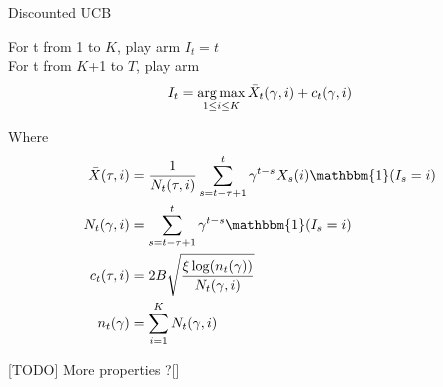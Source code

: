 \begin{algorithm}
    \caption{Discounted UCB}
    \label{alg:d_ucb}
    For t from 1 to $K$, play arm $I_t = t$ \\
    For t from $K$+1 to $T$, play arm 
    $$ I_t = \operatorname*{arg\,max}_{1\leq i \leq K} \bar X_t(\gamma,i) + c_t(\gamma,i)$$
\end{algorithm}

Where
\begin{align}
\bar{X}(\tau, i) &= \frac{1}{N_t(\tau, i)}
\sum_{s=t-\tau+1}^t \gamma^{t-s}X_s(i)\mathbbm{1}(I_s=i)\\
N_t(\gamma, i) &= \sum_{s=t-\tau+1}^t \gamma^{t-s}\mathbbm{1}(I_s=i)\\
c_t(\tau, i) &= 2B\sqrt{\frac{\xi \log(n_t(\gamma))}{N_t(\gamma,i)}}\\
n_t(\gamma) &= \sum_{i=1}^K N_t(\gamma,i)
\end{align}

[TODO] More properties ?[]
